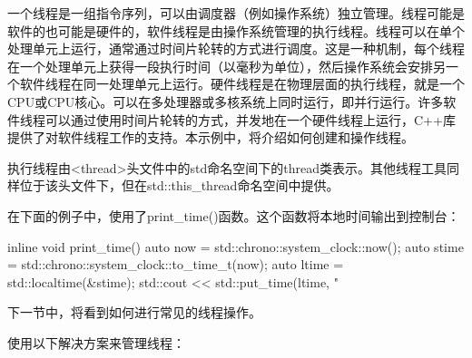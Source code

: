 一个线程是一组指令序列，可以由调度器（例如操作系统）独立管理。线程可能是软件的也可能是硬件的，软件线程是由操作系统管理的执行线程。线程可以在单个处理单元上运行，通常通过时间片轮转的方式进行调度。这是一种机制，每个线程在一个处理单元上获得一段执行时间（以毫秒为单位），然后操作系统会安排另一个软件线程在同一处理单元上运行。硬件线程是在物理层面的执行线程，就是一个CPU或CPU核心。可以在多处理器或多核系统上同时运行，即并行运行。许多软件线程可以通过使用时间片轮转的方式，并发地在一个硬件线程上运行，C++库提供了对软件线程工作的支持。本示例中，将介绍如何创建和操作线程。


执行线程由<thread>头文件中的std命名空间下的thread类表示。其他线程工具同样位于该头文件下，但在std::this\_thread命名空间中提供。

在下面的例子中，使用了print\_time()函数。这个函数将本地时间输出到控制台：

\begin{cpp}
inline void print_time()
{
    auto now = std::chrono::system_clock::now();
    auto stime = std::chrono::system_clock::to_time_t(now);
    auto ltime = std::localtime(&stime);
    std::cout << std::put_time(ltime, "%
}
\end{cpp}

下一节中，将看到如何进行常见的线程操作。


使用以下解决方案来管理线程：

